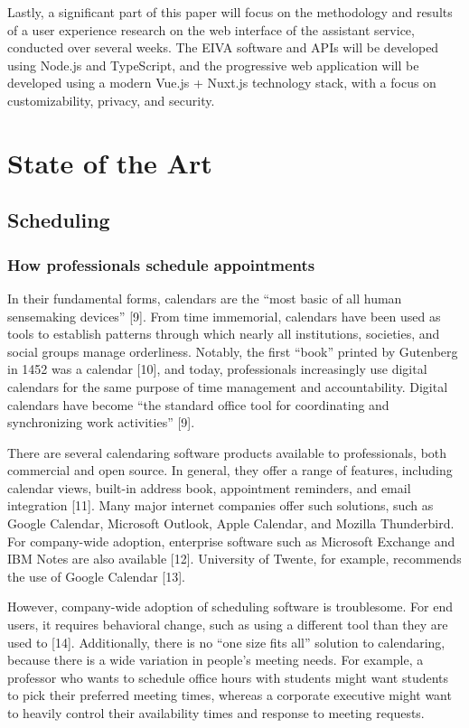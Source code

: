 \documentclass{article}
\begin{document}
Lastly, a significant part of this paper will focus on the methodology and results of a user experience research on the web interface of the assistant service, conducted over several weeks. The EIVA software and APIs will be developed using Node.js and TypeScript, and the progressive web application will be developed using a modern Vue.js + Nuxt.js technology stack, with a focus on customizability, privacy, and security.

\newpage

\section{State of the Art}

\subsection{Scheduling}

\subsubsection{How professionals schedule appointments}

In their fundamental forms, calendars are the “most basic of all human sensemaking devices” [9]. From time immemorial, calendars have been used as tools to establish patterns through which nearly all institutions, societies, and social groups manage orderliness. Notably, the first “book” printed by Gutenberg in 1452 was a calendar [10], and today, professionals increasingly use digital calendars for the same purpose of time management and accountability. Digital calendars have become “the standard office tool for coordinating and synchronizing work activities” [9].

There are several calendaring software products available to professionals, both commercial and open source. In general, they offer a range of features, including calendar views, built-in address book, appointment reminders, and email integration [11]. Many major internet companies offer such solutions, such as Google Calendar, Microsoft Outlook, Apple Calendar, and Mozilla Thunderbird. For company-wide adoption, enterprise software such as Microsoft Exchange and IBM Notes are also available [12]. University of Twente, for example, recommends the use of Google Calendar [13].

However, company-wide adoption of scheduling software is troublesome. For end users, it requires behavioral change, such as using a different tool than they are used to [14]. Additionally, there is no “one size fits all” solution to calendaring, because there is a wide variation in people’s meeting needs. For example, a professor who wants to schedule office hours with students might want students to pick their preferred meeting times, whereas a corporate executive might want to heavily control their availability times and response to meeting requests.
\end{document}
